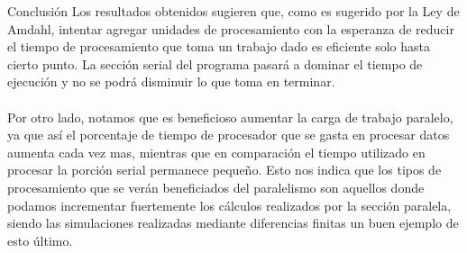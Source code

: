 \begin{section}{Conclusión}
Los resultados obtenidos sugieren que, como es sugerido por la Ley de Amdahl, intentar agregar unidades de procesamiento con la esperanza de reducir el tiempo de procesamiento que toma un trabajo dado es eficiente solo hasta cierto punto. La sección serial del programa pasará a dominar el tiempo de ejecución y no se podrá disminuir lo que toma en terminar.
~\\
~\\
Por otro lado, notamos que es beneficioso aumentar la carga de trabajo paralelo, ya que así el porcentaje de tiempo de procesador que se gasta en procesar datos aumenta cada vez mas, mientras que en comparación el tiempo utilizado en procesar la porción serial permanece pequeño. Esto nos indica que los tipos de procesamiento que se verán beneficiados del paralelismo son aquellos donde podamos incrementar fuertemente los cálculos realizados por la sección paralela, siendo las simulaciones realizadas mediante diferencias finitas un buen ejemplo de esto último.
\end{section}
